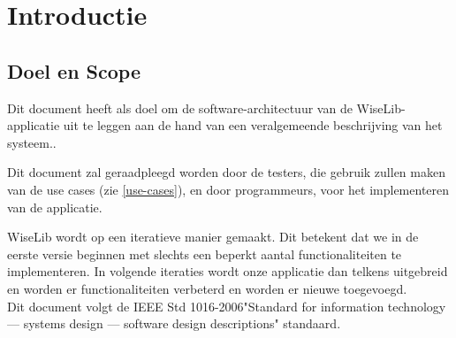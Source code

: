 \section{Introductie}

\subsection{Doel en Scope}

Dit document heeft als doel om de software-architectuur van de WiseLib-applicatie uit te leggen aan de hand van een veralgemeende beschrijving van het systeem.. 

Dit document zal geraadpleegd worden door de testers, die gebruik zullen maken van de use cases (zie \ref{use-cases}), en door programmeurs, voor het implementeren van de applicatie.

WiseLib wordt op een iteratieve manier gemaakt. Dit betekent dat we in de eerste versie beginnen met slechts een beperkt aantal functionaliteiten te implementeren. In volgende iteraties wordt onze applicatie dan telkens uitgebreid en worden er functionaliteiten verbeterd en worden er nieuwe toegevoegd.\\

Dit document volgt de IEEE Std 1016-2006\texttrademark "Standard for information technology — systems design — software design descriptions" standaard.

